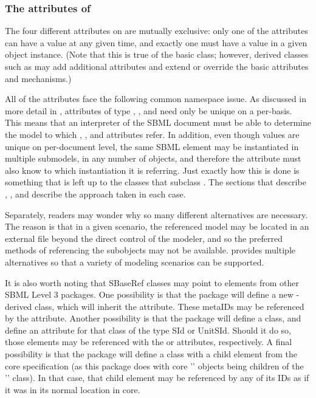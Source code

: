 \subsubsection{The attributes of }

The four different attributes on \SBaseRef are mutually exclusive: only
one of the attributes can have a value at any given time, and exactly
one must have a value in a given \SBaseRef object instance.  (Note that
this is true of the basic \SBaseRef class; however, derived classes such
as \ReplacedElement may add additional attributes and extend or override
the basic attributes and mechanisms.)

All of the attributes face the following common namespace issue.  As
discussed in more detail in , attributes of type
, , and  need only be
unique on a per-\Model basis.  This means that an interpreter of the
SBML document must be able to determine the model to which
, , and  attributes refer.
In addition, even though  values are unique on per-document
level, the same SBML element may be instantiated in multiple submodels,
in any number of \Model objects, and therefore the 
attribute must also know to which \Model instantiation it is referring.
Just exactly how this is done is something that is left up to the
classes that subclass \SBaseRef.  The sections that describe \Port,
\Deletion, \ReplacedElement and \ReplacedBy describe the approach taken
in each case.

Separately, readers may wonder why so many different alternatives are
necessary.  The reason is that in a given scenario, the referenced model
may be located in an external file beyond the direct control of the
modeler, and so the preferred methods of referencing the subobjects may
not be available.  \SBaseRef provides multiple alternatives so that a
variety of modeling scenarios can be supported.

It is also worth noting that SBaseRef classes may point to elements
from other SBML Level 3 packages.  One possibility is that the package
will define a new \SBase-derived class, which will inherit the 
attribute.  These metaIDs may be referenced by the \SBaseRef {}
attribute.  Another possibility is that the package will define a class,
and define an attribute for that class of the type SId or UnitSId.  Should
it do so, those elements may be referenced with the  or 
attributes, respectively.  A final possibility is that the package will 
define a class with a child element from the core specification (as this 
package does with core '\Model' objects being children of the 
'\ListOfModelDefinitions' class).  In that case, that child element may be 
referenced by any of its IDs as if it was in its normal location in core.

